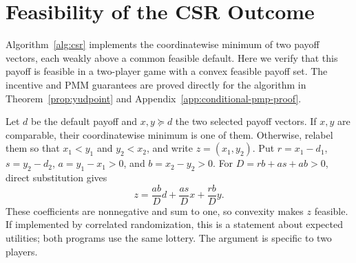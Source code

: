 \section{Feasibility of the CSR Outcome}
\label{app:barg}

Algorithm~\ref{alg:csr} implements the coordinatewise minimum of two
payoff vectors, each weakly above a common feasible default. Here we
verify that this payoff is feasible in a two-player game with a convex
feasible payoff set. The incentive and PMM guarantees are proved
directly for the algorithm in Theorem~\ref{prop:yudpoint} and
Appendix~\ref{app:conditional-pmp-proof}.

Let $d$ be the default payoff and $x,y\succeq d$ the two selected
payoff vectors. If $x,y$ are comparable, their coordinatewise minimum
is one of them. Otherwise, relabel them so that $x_1<y_1$ and $y_2<x_2$,
and write $z=(x_1,y_2)$. Put $r=x_1-d_1$, $s=y_2-d_2$,
$a=y_1-x_1>0$, and $b=x_2-y_2>0$.
For $D=rb+as+ab>0$, direct substitution gives
\[
 z=\frac{ab}{D}d+\frac{as}{D}x+\frac{rb}{D}y.
\]
These coefficients are nonnegative and sum to one, so convexity
makes $z$ feasible. If implemented by correlated randomization, this
is a statement about expected utilities; both programs use the same
lottery. The argument is specific to two players.
